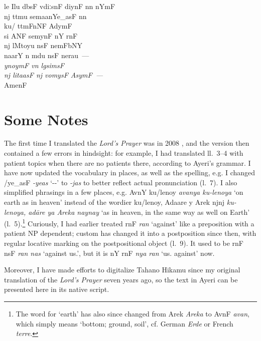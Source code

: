 \documentclass[12pt,paper=a4]{scrartcl}
\newcommand{\fw}[1]{\textit{#1}} %
\newcommand{\tit}[1]{\textit{#1}} %
\newcommand{\qq}[1]{\enquote*{#1}} %
\newcommand{\ayr}[1]{{\Tagati #1}}
\newenvironment{ayeri}{
    \Tagati
}{
}
\begin{document}
\begin{raggedright}
\begin{multicols}{2}
\begin{ayeri}
\begin{linenumbers*}
le Ilu dbsF vdiːsnF diynF nn nYmF \\
nj ttmu semaanYe\_asF nn \\
ku/ ttmFnNF AdymF \\
si ANF semynF nY rnF \\
nj lMtoyu nsF nemFbNY \\
naarY n mdu nsF nerau~— \\ [0.5\baselineskip]

\textit{ynoymF vn lgsimsF \\
nj litaasF nj vomysF AsymF~—} \\ [0.5\baselineskip]

AmenF

\end{linenumbers*}

\end{ayeri}
\end{multicols}
\end{raggedright}

\section{Some Notes}
The first time I translated the \tit{Lord's Prayer} was in 2008 
\autocite[see][]{becker2008}, and the version then contained a few errors in 
hindsight: for example, I had translated ll.~3--4 with patient topics when there 
are no patients there, according to Ayeri's grammar. I have now updated the 
vocabulary in places, as well as the spelling, e.g. I changed \ayr{/ye\_asF} 
\fw{-yeas} \qq{-\Pl{}-\Parg{}} to \fw{-jas} to better reflect actual 
pronunciation (l.~7). I also simplified phrasings in a few places, 
e.g. \ayr{AvnY ku/lenoy} \fw{avanya ku-lenoya} `on earth as in heaven' instead 
of the wordier \ayr{ku/lenoy, Adaare y Arek njnj} \fw{ku-lenoya, adāre 
ya Areka naynay} `as in heaven, in the same way as well on Earth' 
(l.~5).\footnote{The word for `earth' has also since changed from \ayr{Arek} 
\fw{Areka} to \ayr{AvnF} \fw{avan}, which simply means `bottom; ground, soil', 
cf. German \fw{Erde} or French \fw{terre}.} Curiously, I had earlier treated 
\ayr{rnF} \fw{ran} `against' like a preposition with a patient NP dependent; 
custom has changed it into a postposition since then, with regular locative 
marking on the postpositional object (l.~9). It used to be \ayr{rnF nsF} 
\fw{ran nas} `against us.\Parg{}', but it is \ayr{nY rnF} \fw{nya ran} 
`us.\Loc{} against' now.

Moreover, I have made efforts to digitalize Tahano Hikamu since my original 
translation of the \tit{Lord's Prayer} seven years ago, so the text in Ayeri can 
be presented here in its native script.
\end{document}
